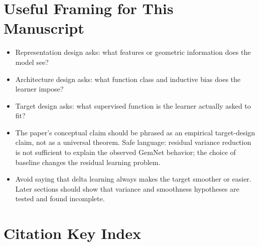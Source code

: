 \documentclass[11pt]{article}
\begin{document}
\section{Useful Framing for This Manuscript}

\begin{itemize}
  \item Representation design asks: what features or geometric information does the model see?

  \item Architecture design asks: what function class and inductive bias does the learner impose?

  \item Target design asks: what supervised function is the learner actually asked to fit?

  \item The paper's conceptual claim should be phrased as an empirical target-design claim, not as a universal theorem. Safe language: residual variance reduction is not sufficient to explain the observed GemNet behavior; the choice of baseline changes the residual learning problem.

  \item Avoid saying that delta learning always makes the target smoother or easier. Later sections should show that variance and smoothness hypotheses are tested and found incomplete.
\end{itemize}

\section{Citation Key Index}
\end{document}
